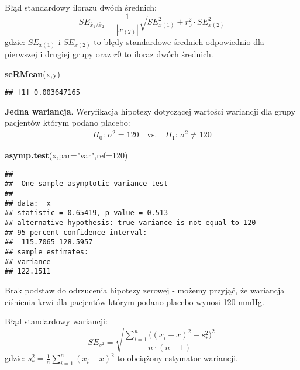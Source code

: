 \documentclass[polish,]{book}
\newenvironment{Shaded}{\begin{snugshade}}{\end{snugshade}}
\newcommand{\DataTypeTok}[1]{\textcolor[rgb]{0.13,0.29,0.53}{#1}}
\newcommand{\DecValTok}[1]{\textcolor[rgb]{0.00,0.00,0.81}{#1}}
\newcommand{\KeywordTok}[1]{\textcolor[rgb]{0.13,0.29,0.53}{\textbf{#1}}}
\newcommand{\NormalTok}[1]{#1}
\newcommand{\StringTok}[1]{\textcolor[rgb]{0.31,0.60,0.02}{#1}}
\begin{document}
Błąd standardowy ilorazu dwóch średnich:
\begin{equation}
SE_{\bar{x}_1/\bar{x}_2}=\frac{1}{|\bar{x}_{(2)}|}
\sqrt{
SE^2_{\bar{x}(1)}+r_0^2\cdot SE^2_{\bar{x}(2)}
}
\label{eq:wz1144}
\end{equation}
gdzie: \(SE_{\bar{x}(1)}\) i \(SE_{\bar{x}(2)}\) to błędy standardowe średnich odpowiednio dla pierwszej i drugiej grupy oraz \(r0\) to iloraz dwóch średnich.

\begin{Shaded}
\begin{Highlighting}[]
\KeywordTok{seRMean}\NormalTok{(x,y)}
\end{Highlighting}
\end{Shaded}

\begin{verbatim}
## [1] 0.003647165
\end{verbatim}

\textbf{Jedna wariancja}. Weryfikacja hipotezy dotyczącej wartości wariancji dla grupy pacjentów którym podano placebo:
\[
\begin{array}{ll}
H_0:\,\sigma^2 = 120\quad\mbox{vs.}\quad H_1:\,\sigma^2 \neq 120
\end{array}
\]

\begin{Shaded}
\begin{Highlighting}[]
\KeywordTok{asymp.test}\NormalTok{(x,}\DataTypeTok{par=}\StringTok{"var"}\NormalTok{,}\DataTypeTok{ref=}\DecValTok{120}\NormalTok{)}
\end{Highlighting}
\end{Shaded}

\begin{verbatim}
## 
##  One-sample asymptotic variance test
## 
## data:  x
## statistic = 0.65419, p-value = 0.513
## alternative hypothesis: true variance is not equal to 120
## 95 percent confidence interval:
##  115.7065 128.5957
## sample estimates:
## variance 
## 122.1511
\end{verbatim}

Brak podstaw do odrzucenia hipotezy zerowej - możemy przyjąć, że wariancja ciśnienia krwi dla pacjentów którym podano placebo wynosi 120 mmHg.

Błąd standardowy wariancji:
\begin{equation}
SE_{s^2}=\sqrt{\frac{\sum_{i=1}^{n}\big((x_i-\bar{x})^2-s^2_*\big)^2}{n\cdot(n-1)}}
\label{eq:wz1146}
\end{equation}
gdzie: \(s^2_{*}=\frac{1}{n}\sum_{i=1}^{n}(x_i-\bar{x})^2\) to obciążony estymator wariancji.
\end{document}
